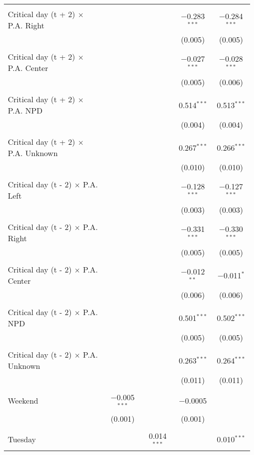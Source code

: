 \documentclass[
]{article}
\begin{document}
\begin{table}[!htbp]
{\begin{tabular}{@{\extracolsep{5pt}}lcccc}
  & & & & \\ 
 Critical day (t + 2) $\times$ P.A. Right &  &  & $-$0.283$^{***}$ & $-$0.284$^{***}$ \\ 
  &  &  & (0.005) & (0.005) \\ 
  & & & & \\ 
 Critical day (t + 2) $\times$ P.A. Center &  &  & $-$0.027$^{***}$ & $-$0.028$^{***}$ \\ 
  &  &  & (0.005) & (0.006) \\ 
  & & & & \\ 
 Critical day (t + 2) $\times$ P.A. NPD &  &  & 0.514$^{***}$ & 0.513$^{***}$ \\ 
  &  &  & (0.004) & (0.004) \\ 
  & & & & \\ 
 Critical day (t + 2) $\times$ P.A. Unknown &  &  & 0.267$^{***}$ & 0.266$^{***}$ \\ 
  &  &  & (0.010) & (0.010) \\ 
  & & & & \\ 
 Critical day (t - 2) $\times$ P.A. Left &  &  & $-$0.128$^{***}$ & $-$0.127$^{***}$ \\ 
  &  &  & (0.003) & (0.003) \\ 
  & & & & \\ 
 Critical day (t - 2) $\times$ P.A. Right &  &  & $-$0.331$^{***}$ & $-$0.330$^{***}$ \\ 
  &  &  & (0.005) & (0.005) \\ 
  & & & & \\ 
 Critical day (t - 2) $\times$ P.A. Center &  &  & $-$0.012$^{**}$ & $-$0.011$^{*}$ \\ 
  &  &  & (0.006) & (0.006) \\ 
  & & & & \\ 
 Critical day (t - 2) $\times$ P.A. NPD &  &  & 0.501$^{***}$ & 0.502$^{***}$ \\ 
  &  &  & (0.005) & (0.005) \\ 
  & & & & \\ 
 Critical day (t - 2) $\times$ P.A. Unknown &  &  & 0.263$^{***}$ & 0.264$^{***}$ \\ 
  &  &  & (0.011) & (0.011) \\ 
  & & & & \\ 
 Weekend & $-$0.005$^{***}$ &  & $-$0.0005 &  \\ 
  & (0.001) &  & (0.001) &  \\ 
  & & & & \\ 
 Tuesday &  & 0.014$^{***}$ &  & 0.010$^{***}$ \\ 

\end{tabular}}
\end{table}
\end{document}
